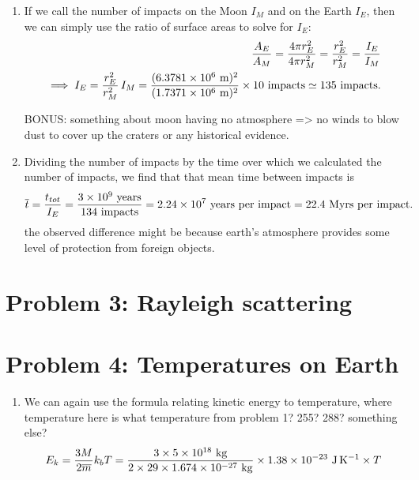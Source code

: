 \documentclass[11pt,letterpaper]{article}
\begin{document}
\begin{enumerate}[label=(\alph*)]
    \item If we call the number of impacts on the Moon $I_M$ and on the Earth $I_E$, then we can simply use the ratio of surface areas to solve for $I_E$:
        \begin{align*}
            \frac{A_E}{A_M} = \frac{4\pi r_E^2}{4\pi r_M^2} = \frac{r_E^2}{r_M^2} = \frac{I_E}{I_M} \\
            \implies I_E = \frac{r_E^2}{r_M^2}\,I_M = \frac{(6.3781\times 10^{6}~{\rm m})^2}{(1.7371\times 10^{6}~{\rm m})^2}\times 10~{\rm impacts} \simeq 135~{\rm impacts}. 
        \end{align*}

        {\huge BONUS: something about moon having no atmosphere => no winds to blow dust to cover up the craters or any historical evidence.}

    \item Dividing the number of impacts by the time over which we calculated the number of impacts, we find that that mean time between impacts is
        \begin{equation*}
            \overline{t} = \frac{t_{tot}}{I_E} = \frac{3\times 10^{9}~{\rm years}}{134~{\rm impacts}} = 2.24\times 10^{7}~\text{years per impact} = 22.4~\text{Myrs per impact}.
        \end{equation*}
        {\huge the observed difference might be because earth's atmosphere provides some level of protection from foreign objects.}
\end{enumerate}




\section*{Problem 3: Rayleigh scattering}

\begin{enumerate}[label=(\alph*)]
\end{enumerate}

\section*{Problem 4: Temperatures on Earth} 

\begin{enumerate}[label=(\alph*)]
    \item We can again use the formula relating kinetic energy to temperature, where temperature here is {\huge what temperature from problem 1? 255? 288? something else?}
        \begin{align*}
            E_k = \frac{3M}{2\overline{m}}k_bT = \frac{3\times 5\times 10^{18}~{\rm kg}}{2\times 29\times 1.674\times 10^{-27}~{\rm kg}} \times 1.38\times 10^{-23}~{\rm J\,K^{-1}} \times T
        \end{align*}
\end{enumerate}
\end{document}
